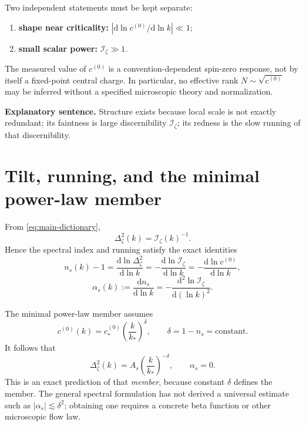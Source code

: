 \documentclass[11pt]{article}
\numberwithin{equation}{section}
\newcommand{\dd}{\mathrm d}
\newcommand{\Iz}{\mathcal I_\zeta}
\newcommand{\cz}{c^{(0)}}
\theoremstyle{definition}
\theoremstyle{remark}
\begin{document}
Two independent statements must be kept separate:
\begin{enumerate}
\item \textbf{shape near criticality:} $|\dd\ln\cz/\dd\ln k|\ll1$;
\item \textbf{small scalar power:} $\Iz\gg1$.
\end{enumerate}
The measured value of $\cz$ is a convention-dependent spin-zero response, not by itself a fixed-point central charge. In particular, no effective rank $N\sim\sqrt{\cz}$ may be inferred without a specified microscopic theory and normalization.

\begin{thesisbox}
\textbf{Explanatory sentence.} Structure exists because local scale is not exactly redundant; its faintness is large discernibility $\Iz$; its redness is the slow running of that discernibility.
\end{thesisbox}

\section{Tilt, running, and the minimal power-law member}
\label{sec:tilt}

From \cref{eq:main-dictionary},
\begin{equation}
\Delta_\zeta^2(k)=\Iz(k)^{-1}.
\end{equation}
Hence the spectral index and running satisfy the exact identities
\begin{equation}
\boxed{
n_s(k)-1
=\frac{\dd\ln\Delta_\zeta^2}{\dd\ln k}
=-\frac{\dd\ln\Iz}{\dd\ln k}
=-\frac{\dd\ln\cz}{\dd\ln k},}
\label{eq:tilt}
\end{equation}
\begin{equation}
\boxed{
\alpha_s(k):=\frac{\dd n_s}{\dd\ln k}
=-\frac{\dd^2\ln\Iz}{\dd(\ln k)^2}.}
\label{eq:running}
\end{equation}

The minimal power-law member assumes
\begin{equation}
\cz(k)=\cz_*
\left(\frac{k}{k_*}\right)^{\delta},
\qquad
\delta=1-n_s=\text{constant}.
\end{equation}
It follows that
\begin{equation}
\Delta_\zeta^2(k)=A_s
\left(\frac{k}{k_*}\right)^{-\delta},
\qquad
\boxed{\alpha_s=0.}
\end{equation}
This is an exact prediction of that \emph{member}, because constant $\delta$ defines the member. The general spectral formulation has not derived a universal estimate such as $|\alpha_s|\lesssim\delta^2$; obtaining one requires a concrete beta function or other microscopic flow law.
\end{document}
